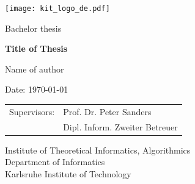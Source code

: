 \documentclass[a4paper,12pt,bibtotoc,titlepage, liststotoc,BCOR7mm,headsepline,pointlessnumbers]{scrbook}
\numberwithin{equation}{section}
\begin{document}

\pagestyle{empty} %
\renewcommand{\thepage}{\roman{page}}

\begin{titlepage}

  \begin{center}\large
  \begin{flushleft}
    \quad\texttt{[image: kit\_logo\_de.pdf]} \hfill
     
  \end{flushleft}

    \vfill
    \vfill
    \vfill
    \vfill

    Bachelor thesis
    \vspace*{2cm}

    {\bf\huge Title of Thesis  \par}

    \vfill

    Name of author

    \vspace*{15mm}

    Date: \today 

    \vspace*{40mm}
    \begin{tabular}{rl}
      Supervisors: & Prof. Dr. Peter Sanders \\
      & Dipl. Inform. Zweiter Betreuer \\
    \end{tabular}
    
    \vspace*{10mm}


    \vspace*{10mm}
     Institute of Theoretical Informatics, Algorithmics \\
     Department of Informatics \\
     Karlsruhe Institute of Technology

    \vspace*{12mm}
    \vfill
  \end{center}

\end{titlepage}
\end{document}
